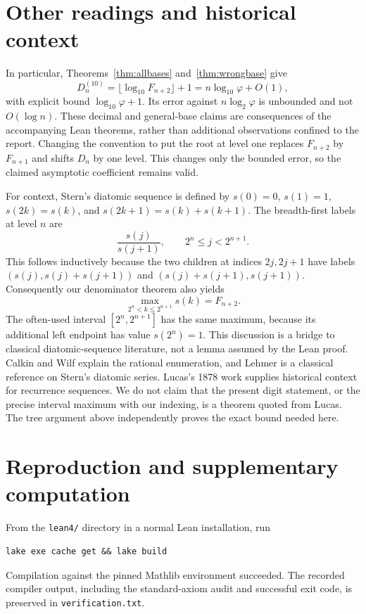 \documentclass[11pt]{article}
\newcommand{\ph}{\varphi}
\begin{document}
\section{Other readings and historical context}
In particular, Theorems~\ref{thm:allbases} and~\ref{thm:wrongbase} give
\[
 D_n^{(10)}=\lfloor\log_{10}F_{n+2}\rfloor+1
           =n\log_{10}\ph+O(1),
\]
with explicit bound $\log_{10}\ph+1$. Its error against $n\log_2\ph$
is unbounded and not $O(\log n)$. These decimal and general-base claims
are consequences of the accompanying Lean theorems, rather than
additional observations confined to the report.
Changing the convention to put the root at level one replaces $F_{n+2}$ by
$F_{n+1}$ and shifts $D_n$ by one level. This changes only the bounded error,
so the claimed asymptotic coefficient remains valid.

For context, Stern's diatomic sequence is defined by
$s(0)=0$, $s(1)=1$, $s(2k)=s(k)$, and $s(2k+1)=s(k)+s(k+1)$.
The breadth-first labels at level $n$ are
\[
 \frac{s(j)}{s(j+1)},\qquad 2^n\le j<2^{n+1}.
\]
This follows inductively because the two children at indices $2j,2j+1$
have labels $(s(j),s(j)+s(j+1))$ and
$(s(j)+s(j+1),s(j+1))$.
Consequently our denominator theorem also yields
\[
 \max_{2^n<k\le2^{n+1}}s(k)=F_{n+2}.
\]
The often-used interval $[2^n,2^{n+1}]$ has the same maximum, because its
additional left endpoint has value $s(2^n)=1$. This discussion is a bridge
to classical diatomic-sequence literature, not a lemma assumed by the Lean
proof. Calkin and Wilf \cite{cw} explain the rational enumeration, and
Lehmer \cite{lehmer} is a classical reference on Stern's diatomic series.
Lucas's 1878 work \cite{lucas} supplies historical context for recurrence
sequences. We do not claim that the present digit statement, or the precise
interval maximum with our indexing, is a theorem quoted from Lucas.
The tree argument above independently proves the exact bound needed here.

\section{Reproduction and supplementary computation}
From the \texttt{lean4/} directory in a normal Lean installation, run
\begin{verbatim}
lake exe cache get && lake build
\end{verbatim}
Compilation against the pinned Mathlib environment succeeded. The recorded
compiler output, including the standard-axiom audit and successful exit code,
is preserved in \texttt{verification.txt}.
\end{document}
